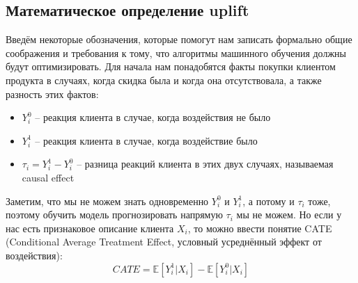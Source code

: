 \iffalse
------
\fi













\iffalse

\subsection{АБ-тесты и uplift-моделирование}
связь с аб тестами ???
аплифт -- продвинутый персонализированный аб

    2.2. Основные принципы аплифт моделирования
    Принцип разности эффектов (Difference-in-Differences).
    Принцип двойного отбора (Double Selection).
    Принцип анализа случайных контрольных групп (Randomized Control Trials).

\fi














\subsection{Математическое определение uplift}

\iffalse
что такое аплифт математически
\fi

Введём некоторые обозначения, которые помогут нам записать формально общие соображения и требования к тому, что алгоритмы машинного обучения должны будут оптимизировать. Для начала нам понадобятся факты покупки клиентом продукта в случаях, когда скидка была и когда она отсутствовала, а также разность этих фактов:
\begin{itemize}
    \item $Y_i^0$ -- реакция клиента в случае, когда воздействия не было
    \item $Y_i^1$ -- реакция клиента в случае, когда воздействие было
    \item $\tau_i = Y_i^1 - Y_i^0$ -- разница реакций клиента в этих двух случаях, называемая causal effect
\end{itemize}

Заметим, что мы не можем знать одновременно $Y_i^0$ и $Y_i^1$, а потому и $\tau_i$ тоже, поэтому обучить модель прогнозировать напрямую $\tau_i$ мы не можем. Но если у нас есть признаковое описание клиента $X_i$, то можно ввести понятие CATE (Conditional Average Treatment Effect, условный усреднённый эффект от воздействия):
$$
    CATE = \mathbb{E} \left[ Y_i^1 | X_i \right] - \mathbb{E} \left[ Y_i^0 | X_i \right]
$$

